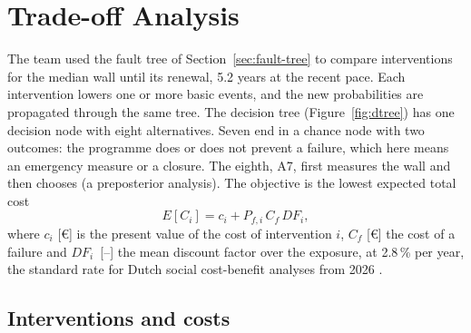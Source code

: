 \section{Trade-off Analysis}
\label{sec:tradeoff}

The team used the fault tree of Section~\ref{sec:fault-tree} to compare
interventions for the median wall until its renewal, 5.2 years at the recent
pace. Each intervention lowers one or more basic events, and the new
probabilities are propagated through the same tree. The decision tree
(Figure~\ref{fig:dtree}) has one decision node with eight alternatives. Seven end
in a chance node with two outcomes: the programme does or does not prevent a
failure, which here means an emergency measure or a closure. The eighth, A7,
first measures the wall and then chooses (a preposterior analysis). The
objective is the lowest expected total cost
\begin{equation}
  E[C_i] = c_i + P_{f,i}\, C_f\, \mathit{DF}_i ,
\end{equation}
where $c_i$ [\euro] is the present value of the cost of intervention $i$, $C_f$
[\euro] the cost of a failure and $\mathit{DF}_i$~\mbox{[--]} the mean discount factor
over the exposure, at 2.8\,\% per year, the standard rate for Dutch social
cost-benefit analyses from 2026 \parencite{discontovoet2025}.

\subsection{Interventions and costs}\label{sec:to-interventions}

